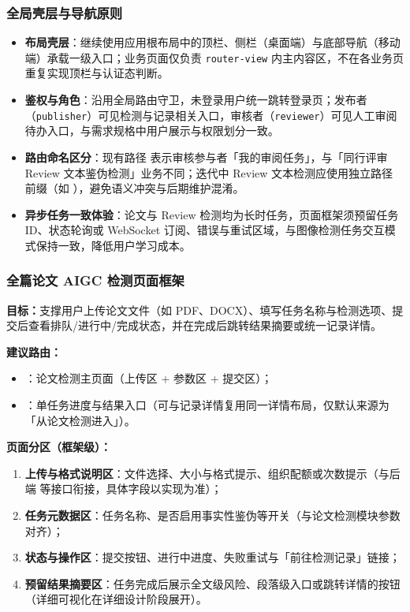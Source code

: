 \subsubsection{全局壳层与导航原则}
\begin{itemize}[leftmargin=2em]
    \item \textbf{布局壳层}：继续使用应用根布局中的顶栏、侧栏（桌面端）与底部导航（移动端）承载一级入口；业务页面仅负责 \texttt{router-view} 内主内容区，不在各业务页重复实现顶栏与认证态判断。
    \item \textbf{鉴权与角色}：沿用全局路由守卫，未登录用户统一跳转登录页；发布者（\texttt{publisher}）可见检测与记录相关入口，审核者（\texttt{reviewer}）可见人工审阅待办入口，与需求规格中用户展示与权限划分一致。
    \item \textbf{路由命名区分}：现有路径  表示审核参与者「我的审阅任务」，与「同行评审 Review 文本鉴伪检测」业务不同；迭代中 Review 文本检测应使用独立路径前缀（如 ），避免语义冲突与后期维护混淆。
    \item \textbf{异步任务一致体验}：论文与 Review 检测均为长时任务，页面框架须预留任务 ID、状态轮询或 WebSocket 订阅、错误与重试区域，与图像检测任务交互模式保持一致，降低用户学习成本。
\end{itemize}

\subsubsection{全篇论文 AIGC 检测页面框架}
\textbf{目标：}支撑用户上传论文文件（如 PDF、DOCX）、填写任务名称与检测选项、提交后查看排队/进行中/完成状态，并在完成后跳转结果摘要或统一记录详情。

\textbf{建议路由：}
\begin{itemize}[leftmargin=2em]
    \item {}：论文检测主页面（上传区 + 参数区 + 提交区）；
    \item {}：单任务进度与结果入口（可与记录详情复用同一详情布局，仅默认来源为「从论文检测进入」）。
\end{itemize}

\textbf{页面分区（框架级）：}
\begin{enumerate}[leftmargin=2em]
    \item \textbf{上传与格式说明区}：文件选择、大小与格式提示、组织配额或次数提示（与后端  等接口衔接，具体字段以实现为准）；
    \item \textbf{任务元数据区}：任务名称、是否启用事实性鉴伪等开关（与论文检测模块参数对齐）；
    \item \textbf{状态与操作区}：提交按钮、进行中进度、失败重试与「前往检测记录」链接；
    \item \textbf{预留结果摘要区}：任务完成后展示全文级风险、段落级入口或跳转详情的按钮（详细可视化在详细设计阶段展开）。
\end{enumerate}

